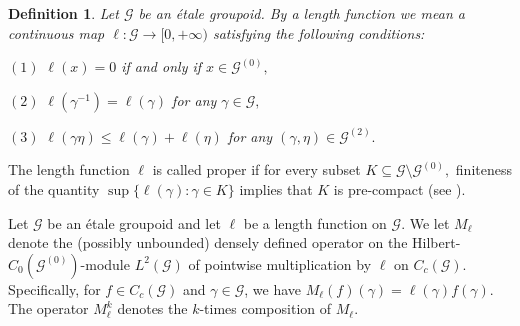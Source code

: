 \documentclass[a4paper,11pt,reqno]{amsart}
\theoremstyle{plain}
\newtheorem{defn}[thm]{Definition}
\theoremstyle{named}
\numberwithin{equation}{section}
\begin{document}
			\begin{defn}\label{def-length-fun}\cite[Definition 2.5]{Weygandt-2024-Rapid-decay-for-etale-gpd}
				Let $\mathcal G$ be an {\'e}tale groupoid. By a length function we mean a continuous map $\ell : \mathcal G \to [0, +\infty)$ satisfying the following conditions:
				
				\vspace{2mm}
				
				$(1)$ $\ell (x) = 0$ if and only if $x \in \mathcal G^{(0)},$
				
				$(2)$ $\ell \left (\gamma^{-1} \right ) = \ell (\gamma)$ for any $\gamma \in \mathcal G,$
				
				$(3)$ $\ell (\gamma \eta) \leq \ell (\gamma) + \ell (\eta)$ for any $(\gamma, \eta) \in \mathcal G^{(2)}.$
			\end{defn}
			The length function \(\ell\) is called proper if for every subset $K \subseteq \mathcal G \setminus \mathcal G^{(0)},$ finiteness of the quantity $\sup \{\ell (\gamma) : \gamma \in K\}$ implies that $K$ is pre-compact (see \cite[Definition 2.5]{Weygandt-2024-Rapid-decay-for-etale-gpd}).
			
		
			
			Let $\mathcal G$ be an étale groupoid and let $\ell$ be a length function on $\mathcal G.$ We let $M_{\ell}$ denote the (possibly unbounded) densely defined operator on the Hilbert-$C_0(\mathcal G^{(0)})$-module $L^2 (\mathcal G)$ of pointwise multiplication by $\ell$ on $C_c (\mathcal G)$.
			 Specifically, for \(f \in C_c(\mathcal{G})\) and \(\gamma \in \mathcal{G}\), we have
			 	\(M_{\ell}(f)(\gamma) = \ell(\gamma)f(\gamma). \) The operator \(M^k_{\ell}\) denotes the \(k\)-times composition of \(M_{\ell}\).
		
\end{document}
